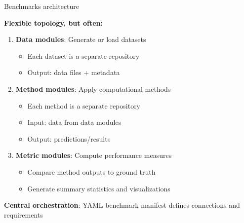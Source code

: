 \documentclass[aspectratio=169]{beamer}
\begin{document}
\begin{frame}{Benchmarks architecture}
  
   \textbf{Flexible topology, but often:}
    \begin{enumerate}
        \item \textbf{Data modules}: Generate or load datasets
            \begin{itemize}
                \item Each dataset is a separate repository
                \item Output: data files + metadata
            \end{itemize}
        
        \item \textbf{Method modules}: Apply computational methods
            \begin{itemize}
                \item Each method is a separate repository
                \item Input: data from data modules
                \item Output: predictions/results
            \end{itemize}
        
        \item \textbf{Metric modules}: Compute performance measures
            \begin{itemize}
                \item Compare method outputs to ground truth
                \item Generate summary statistics and visualizations
            \end{itemize}
    \end{enumerate}
    
    \vspace{0.3cm}
    \textbf{Central orchestration}: YAML benchmark manifest defines connections and requirements
\end{frame}
\end{document}
